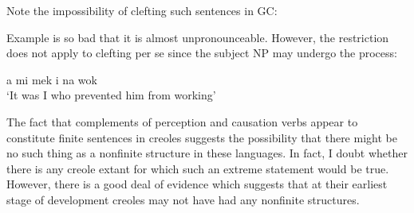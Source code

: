 \z

\z

\z

\z

\noindent Note the impossibility of clefting such sentences in GC:


\z

\z

\z

\z

Example  is so bad that it is almost unpronounceable. However, the restriction does not apply to clefting per se since the subject NP may undergo the process:

\ea a mi mek i na wok\\
\glt `It was I who prevented him from working'
\label{ex:2:161}
\z

The fact that complements of perception and causation verbs appear to constitute finite sentences in creoles suggests the possibility that there might be no such thing as a nonfinite structure in these languages. In fact, I doubt whether there is any creole extant for which such an extreme statement would be true. However, there is a good deal of evidence which suggests that at their earliest stage of develop\-ment creoles may not have had any nonfinite structures.\\\\


